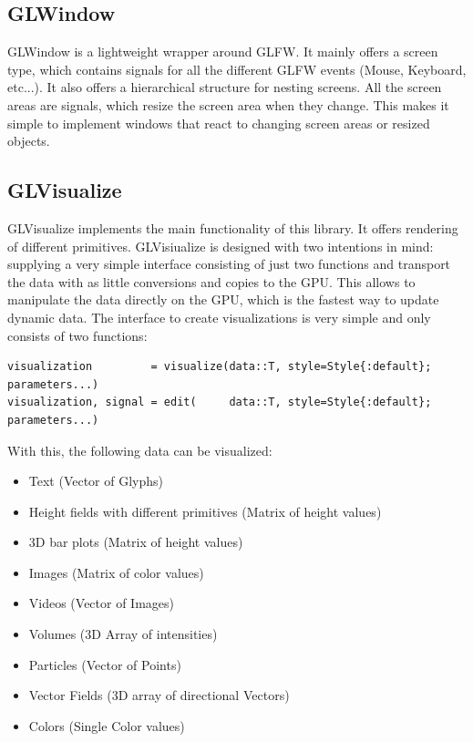 \subsection{GLWindow}
GLWindow is a lightweight wrapper around GLFW.
It mainly offers a screen type, which contains signals for all the different GLFW events (Mouse, Keyboard, etc...). 
It also offers a hierarchical structure for nesting screens. 
All the screen areas are signals, which resize the screen area when they change. 
This makes it simple to implement windows that react to changing screen areas or resized objects.



\subsection{GLVisualize}
GLVisualize implements the main functionality of this library.
It offers rendering of different primitives. GLVisiualize is designed with two intentions in mind: supplying a very simple interface consisting of just two functions and transport the data with as little conversions and copies to the GPU.
This allows to manipulate the data directly on the GPU, which is the fastest way to update dynamic data.
The interface to create visualizations is very simple and only consists of two functions:
\begin{lstlisting}
visualization 		  = visualize(data::T, style=Style{:default}; parameters...)
visualization, signal = edit(     data::T, style=Style{:default}; parameters...)
\end{lstlisting}

With this, the following data can be visualized:
\begin{itemize}
	\item Text (Vector of Glyphs)
	\item Height fields with different primitives (Matrix of height values)
	\item 3D bar plots (Matrix of height values)
	\item Images (Matrix of color values)
	\item Videos (Vector of Images)
	\item Volumes (3D Array of intensities)
	\item Particles (Vector of Points)
	\item Vector Fields (3D array of directional Vectors)
	\item Colors (Single Color values)
\end{itemize}

